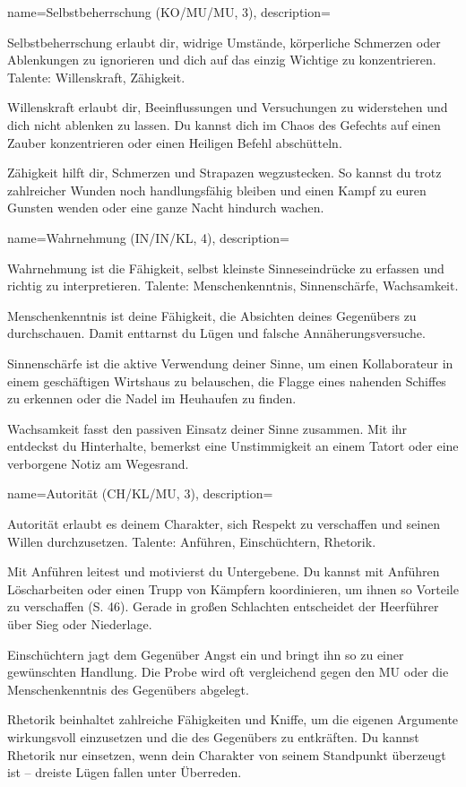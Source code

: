 {
    name={Selbstbeherrschung (KO/MU/MU, 3)},
    description={Selbstbeherrschung erlaubt dir, widrige Umstände, körperliche Schmerzen oder Ablenkungen zu ignorieren und dich auf das einzig Wichtige zu konzentrieren. Talente: Willenskraft, Zähigkeit.
\begin{description}
\item Willenskraft erlaubt dir, Beeinflussungen und Versuchungen zu widerstehen und dich nicht ablenken zu lassen. Du kannst dich im Chaos des Gefechts auf einen Zauber konzentrieren oder einen Heiligen Befehl abschütteln. 
\item Zähigkeit hilft dir, Schmerzen und Strapazen wegzustecken. So kannst du trotz zahlreicher Wunden noch handlungsfähig bleiben und einen Kampf zu euren Gunsten wenden oder eine ganze Nacht hindurch wachen.
\end{description}}}

{
    name={Wahrnehmung (IN/IN/KL, 4)},
    description={Wahrnehmung ist die Fähigkeit, selbst kleinste Sinneseindrücke zu erfassen und richtig zu interpretieren. Talente: Menschenkenntnis, Sinnenschärfe, Wachsamkeit.
\begin{description}
\item Menschenkenntnis ist deine Fähigkeit, die Absichten deines Gegenübers zu durchschauen. Damit enttarnst du Lügen und falsche Annäherungsversuche.
\item Sinnenschärfe ist die aktive Verwendung deiner Sinne, um einen Kollaborateur in einem geschäftigen Wirtshaus zu belauschen, die Flagge eines nahenden Schiffes zu erkennen oder die Nadel im Heuhaufen zu finden.\item Wachsamkeit fasst den passiven Einsatz deiner Sinne zusammen. Mit ihr entdeckst du Hinterhalte, bemerkst eine Unstimmigkeit an einem Tatort oder eine verborgene Notiz am Wegesrand.
\end{description}}}

{
    name={Autorität (CH/KL/MU, 3)},
    description={Autorität erlaubt es deinem Charakter, sich Respekt zu verschaffen und seinen Willen durchzusetzen. Talente: Anführen, Einschüchtern, Rhetorik.
\begin{description}
\item Mit Anführen leitest und motivierst du Untergebene. Du kannst mit Anführen Löscharbeiten oder einen Trupp von Kämpfern koordinieren, um ihnen so Vorteile zu verschaffen (S. 46). Gerade in großen Schlachten entscheidet der Heerführer über Sieg oder Niederlage.
\item Einschüchtern jagt dem Gegenüber Angst ein und bringt ihn so zu einer gewünschten Handlung. Die Probe wird oft vergleichend gegen den MU oder die Menschenkenntnis des Gegenübers abgelegt.
\item Rhetorik beinhaltet zahlreiche Fähigkeiten und Kniffe, um die eigenen Argumente wirkungsvoll einzusetzen und die des Gegenübers zu entkräften. Du kannst Rhetorik nur einsetzen, wenn dein Charakter von seinem Standpunkt überzeugt ist – dreiste Lügen fallen unter Überreden.
\end{description}}}

